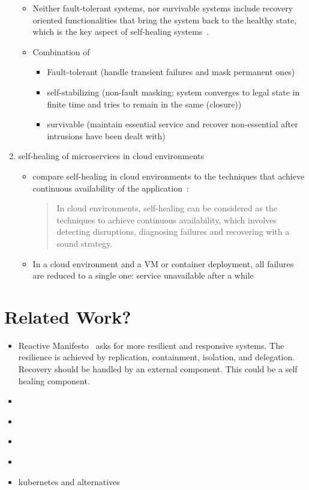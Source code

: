\begin{enumerate}
\begin{itemize}
        \item Neither fault-tolerant systems, nor survivable systems include recovery oriented functionalities that bring the system back to the healthy state, which is the key aspect of self-healing systems~\cite{Ghosh}.

        \item Combination of~\cite{PsaierSurvey}
          \begin{itemize}
            \item Fault-tolerant (handle transient failures and mask permanent ones)
            \item self-stabilizing (non-fault masking; system converges to legal state in finite time and tries to remain in the same (closure))
            \item survivable (maintain essential service and recover non-essential after intrusions have been dealt with)
          \end{itemize}
      \end{itemize}

    \item self-healing of microservices in cloud environments
      \begin{itemize}
        \item \citeauthor{PsaierSurvey} compare self-healing in cloud environments to the techniques that achieve continuous availability of the application~\cite{PsaierSurvey}:
          \begin{quote}
            In cloud environments, self-healing can be considered as the techniques to achieve continuous availability, which involves detecting disruptions, diagnosing failures and recovering with a sound strategy.
          \end{quote}
        \item In a cloud environment and a VM or container deployment, all failures are reduced to a single one: service unavailable after a while
      \end{itemize}
  \end{enumerate}

\section{Related Work?}
  \begin{itemize}
    \item Reactive Manifesto~\cite{reactivemanifesto} asks for more resilient and responsive systems. The resilience is achieved by replication, containment, isolation, and delegation. Recovery should be handled by an external component. This could be a self healing component.
    \item \cite{ToffettiMicroservices}
    \item \cite{StackCloud}
    \item \cite{gru}
    \item \cite{DashofyArchitecture}
    \item \gls{kubernetes} and alternatives
  \end{itemize}

